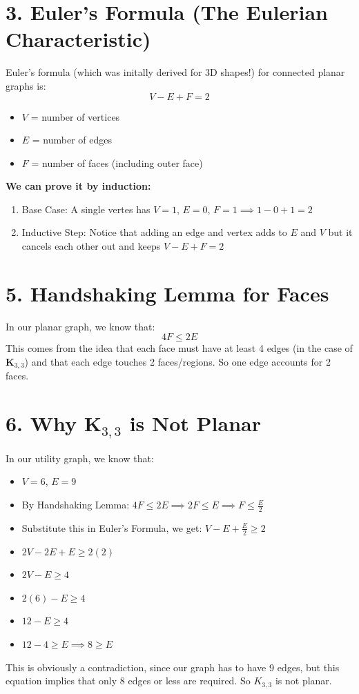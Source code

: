 \documentclass[12pt]{exam}
\begin{document}
\section*{3. Euler's Formula (The Eulerian Characteristic)}
Euler's formula (which was initally derived for 3D shapes!) for connected planar graphs is:
\[
V - E + F = 2
\]
\begin{itemize}
    \item $V$ = number of vertices
    \item $E$ = number of edges
    \item $F$ = number of faces (including outer face)
\end{itemize}

\textbf{We can prove it by induction:}
\begin{enumerate}
    \item Base Case: A single vertes has $V=1$, $E=0$, $F=1 \implies 1 - 0 + 1 = 2$
    \item Inductive Step: Notice that adding an edge and vertex adds to $E$ and $V$ but it cancels each other out and keeps $V - E + F = 2$
\end{enumerate}

\section*{5. Handshaking Lemma for Faces}
In our planar graph, we know that:
\[
4F \leq 2E
\]
This comes from the idea that each face must have at least 4 edges (in the case of \textbf{K$_{3,3}$}) and that each edge touches 2 faces/regions. So one edge accounts for 2 faces.

\section*{6. Why K$_{3,3}$ is Not Planar}
In our utility graph, we know that:
\begin{itemize}
    \item $V = 6$, $E = 9$
    \item By Handshaking Lemma: $4F \leq 2E \implies 2F \leq E \implies F \leq \frac{E}{2}$
    \item Substitute this in Euler's Formula, we get: $V - E + \frac{E}{2} \geq 2$
    \item $2V - 2E + E \geq 2(2)$
    \item $2V - E \geq 4$
    \item $2(6) - E \geq 4$
    \item $12 - E \geq 4$
    \item $12 - 4 \geq E \implies 8 \geq E$
\end{itemize}
This is obviously a contradiction, since our graph has to have 9 edges, but this equation implies that only 8 edges or less are required. 
So $K_{3,3}$ is not planar.
\end{document}
